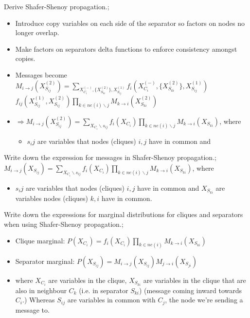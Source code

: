 \documentclass{article}
\begin{document}
Derive Shafer-Shenoy propagation.; \begin{itemize} \item Introduce copy variables on each side of the separator so factors on nodes no longer overlap.  \item Make factors on separators delta functions to enforce consistency amongst copies.  \item Messages become $M_{i\rightarrow j}(X^{(2)}_{S_{ij}})=\sum_{X^{(-)}_{C_i},\{X_{S_{ki}}^{(2)}\},X^{(1)}_{S_{ij}}}f_i(X^{(-)}_{C_i},\{X_{S_{ki}}^{(2)}\},X^{(1)}_{S_{ij}})$\newline$f_{ij}(X^{(1)}_{S_{ij}},X^{(2)}_{S_{ij}}) \prod_{k\in ne(i)\backslash j}M_{k\rightarrow i}(X^{(2)}_{S_{ki}})$ \item $\Rightarrow M_{i\rightarrow j}(X^{(2)}_{S_{ij}})=\sum_{X_{C_i}\backslash s_{ij}}f_i(X_{C_i})\prod_{k\in ne(i)\backslash j}M_{k\rightarrow i}(X_{S_{ki}})$, where \begin{itemize} \item $s_ij$ are variables that nodes (cliques) $i, j$ have in common and \end{itemize} \end{itemize}

Write down the expression for messages in Shafer-Shenoy propagation.; $M_{i\rightarrow j}(X_{S_{ij}})=\sum_{X_{C_i}\backslash s_{ij}}f_i(X_{C_i})\prod_{k\in ne(i)\backslash j}M_{k\rightarrow i}(X_{S_{ki}})$, where \begin{itemize} \item $s_ij$ are variables that nodes (cliques) $i, j$ have in common and $X_{S_{ki}}$ are variables nodes (cliques) $k, i$ have in common.  \end{itemize}

Write down the expressions for marginal distributions for cliques and separators when using Shafer-Shenoy propagation.; \begin{itemize} \item Clique marginal: $P(X_{C_i})=f_i(X_{C_i})\prod_{k\in ne(i)}M_{k\rightarrow i}(X_{S_{ki}})$ \item Separator marginal: $P(X_{S_{ij}})=M_{i\rightarrow j}(X_{S_{ij}})M_{j\rightarrow i}(X_{S_{ji}})$ \item where $X_{C_i}$ are variables in the clique, $X_{S_{ki}}$ are variables in the clique that are also in neighbour $C_k$ (i.e. in separator $S_{ki}$) (message coming inward towards $C_i$.) Whereas $S_{ij}$ are variables in common with $C_j$, the node we're sending a message to.  \end{itemize} 
\end{document}
